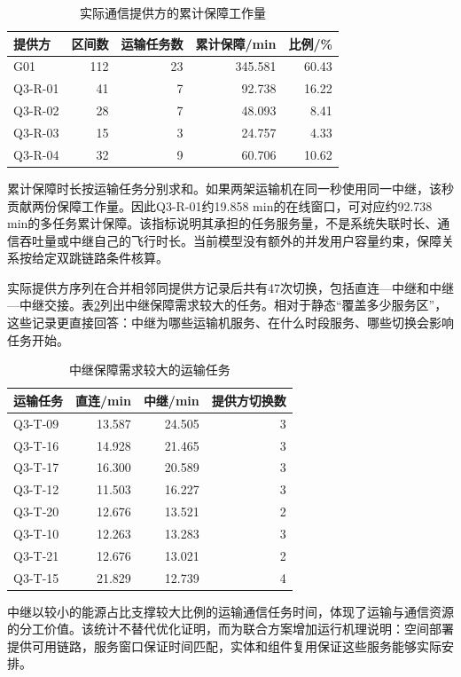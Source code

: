 \documentclass[withoutpreface,colorprint]{format}
\numberwithin{equation}{section}
\numberwithin{figure}{section}
\numberwithin{table}{section}
\begin{document}
\begin{table}[htbp]\centering\small
\caption{实际通信提供方的累计保障工作量}\label{tab:rev_q3_provider}
\begin{tabular}{lrrrr}\toprule
提供方 & 区间数 & 运输任务数 & 累计保障/min & 比例/\%\\\midrule
G01 & 112 & 23 & 345.581 & 60.43\\
Q3-R-01 & 41 & 7 & 92.738 & 16.22\\
Q3-R-02 & 28 & 7 & 48.093 & 8.41\\
Q3-R-03 & 15 & 3 & 24.757 & 4.33\\
Q3-R-04 & 32 & 9 & 60.706 & 10.62\\
\bottomrule\end{tabular}
\end{table}


累计保障时长按运输任务分别求和。如果两架运输机在同一秒使用同一中继，该秒贡献两份保障工作量。因此Q3-R-01约19.858 min的在线窗口，可对应约92.738 min的多任务累计保障。该指标说明其承担的任务服务量，不是系统失联时长、通信吞吐量或中继自己的飞行时长。当前模型没有额外的并发用户容量约束，保障关系按给定双跳链路条件核算。

实际提供方序列在合并相邻同提供方记录后共有47次切换，包括直连—中继和中继—中继交接。表\ref{tab:rev_q3_comm_tasks}列出中继保障需求较大的任务。相对于静态“覆盖多少服务区”，这些记录更直接回答：中继为哪些运输机服务、在什么时段服务、哪些切换会影响任务开始。

\begin{table}[htbp]\centering\small
\caption{中继保障需求较大的运输任务}\label{tab:rev_q3_comm_tasks}
\begin{tabular}{lrrr}\toprule
运输任务 & 直连/min & 中继/min & 提供方切换数\\\midrule
Q3-T-09 & 13.587 & 24.505 & 3\\
Q3-T-16 & 14.928 & 21.465 & 3\\
Q3-T-17 & 16.300 & 20.589 & 3\\
Q3-T-12 & 11.503 & 16.227 & 3\\
Q3-T-20 & 12.676 & 13.521 & 2\\
Q3-T-10 & 12.263 & 13.283 & 3\\
Q3-T-21 & 12.676 & 13.021 & 2\\
Q3-T-15 & 21.829 & 12.739 & 4\\
\bottomrule\end{tabular}
\end{table}


中继以较小的能源占比支撑较大比例的运输通信任务时间，体现了运输与通信资源的分工价值。该统计不替代优化证明，而为联合方案增加运行机理说明：空间部署提供可用链路，服务窗口保证时间匹配，实体和组件复用保证这些服务能够实际安排。
\end{document}
